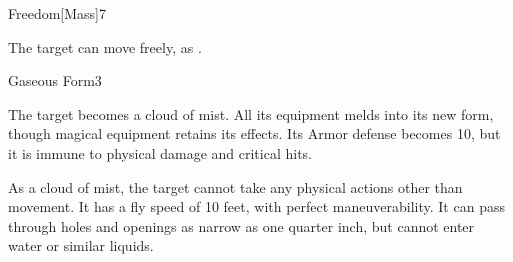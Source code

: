 \begin{spellsection}{Freedom}[Mass]{7}
\begin{spellheader}
\end{spellheader}
\begin{spellcontent}
    \begin{spelltargetinginfo}
    \end{spelltargetinginfo}
    \begin{spelleffects}
        \spelleffect The target can move freely, as .
        \spelldur \durshort
    \end{spelleffects}
\end{spellcontent}
\begin{spellfooter}
\end{spellfooter}

\begin{comment}
\subsubsection{G}
\end{comment}
\end{spellsection}

\begin{spellsection}{Gaseous Form}{3}
\begin{spellheader}
\end{spellheader}
\begin{spellcontent}
    \begin{spelltargetinginfo}
    \end{spelltargetinginfo}
    \begin{spelleffects}
        \spelleffect The target becomes a cloud of mist. All its equipment melds into its new form, though magical equipment retains its effects. Its Armor defense becomes 10, but it is immune to physical damage and critical hits.

        As a cloud of mist, the target cannot take any physical actions other than movement. It has a fly speed of 10 feet, with perfect maneuverability. It can pass through holes and openings as narrow as one quarter inch, but cannot enter water or similar liquids.
        \spelldur \durshort \dismissable
    \end{spelleffects}
\end{spellcontent}
\begin{spellfooter}
\end{spellfooter}
\end{spellsection}

